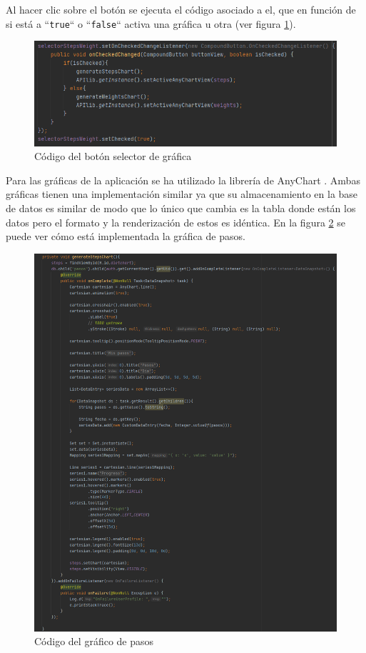 Al hacer clic sobre el botón se ejecuta el código asociado a el, que en función de si está a ``\texttt{true}`` o ``\texttt{false}`` activa una gráfica u otra (ver figura \ref{fig:selectorcode}). 
\begin{figure}[H]
    \centering
    \includegraphics[width=\textwidth]{Images/Capitulo7/selectorcode.png}
    \caption{Código del botón selector de gráfica}
    \label{fig:selectorcode}
\end{figure}

Para las gráficas de la aplicación se ha utilizado la librería de AnyChart \cite{anychart}. Ambas gráficas tienen una implementación similar ya que su almacenamiento en la base de datos es similar de modo que lo único que cambia es la tabla donde están los datos pero el formato y la renderización de estos es idéntica. En la figura \ref{fig:stepschart} se puede ver cómo está implementada la gráfica de pasos.
\begin{figure}[H]
    \centering
    \includegraphics[width=\textwidth]{Images/Capitulo7/stepschart.png}
    \caption{Código del gráfico de pasos}
    \label{fig:stepschart}
\end{figure}
    
